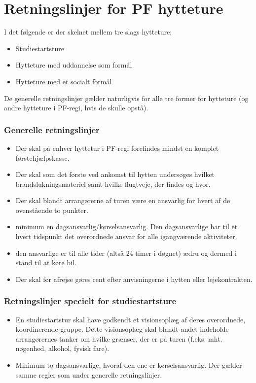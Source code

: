 \section{Retningslinjer for PF hytteture}
I det følgende er der skelnet mellem tre slags hytteture;
\begin{itemize}
\item Studiestartsture
\item Hytteture med uddannelse som formål
\item Hytteture med et socialt formål
\end{itemize}

De generelle retningslinjer gælder naturligvis for alle tre former for hytteture (og andre hytteture i PF-regi, hvis de
skulle opstå).

\subsubsection{Generelle retningslinjer}
\begin{itemize}
\item Der skal på enhver hyttetur i PF-regi forefindes mindst en komplet førstehjælpskasse.
\item Der skal som det første ved ankomst til hytten undersøges hvilket brandslukningsmateriel samt hvilke
flugtveje, der findes og hvor.
\item Der skal blandt arrangørerne af turen være en ansvarlig for hvert af de ovenstående to punkter.
\item minimum en dagsansvarlig/kørselsansvarlig. Den dagsansvarlige har til et hvert tidspunkt det overordnede
ansvar for alle igangværende aktiviteter.
\item den ansvarlige er til alle tider (altså 24 timer i døgnet) ædru og dermed i stand til at køre bil.
\item Der skal før afrejse gøres rent efter anvisningerne i hytten eller lejekontrakten.
\end{itemize}

\subsubsection{Retningslinjer specielt for studiestartsture}
\begin{itemize}
\item En studiestartstur skal have godkendt et visionsoplæg af deres overordnede, koordinerende gruppe. Dette
visionsoplæg skal blandt andet indeholde arrangørernes tanker om hvilke grænser, der er på turen (f.eks. mht.
nøgenhed, alkohol, fysisk fare).
\item Minimum to dagsansvarlige, hvoraf den ene er kørselsansvarlig. Der gælder samme regler som under generelle
retningslinjer.
\end{itemize}

